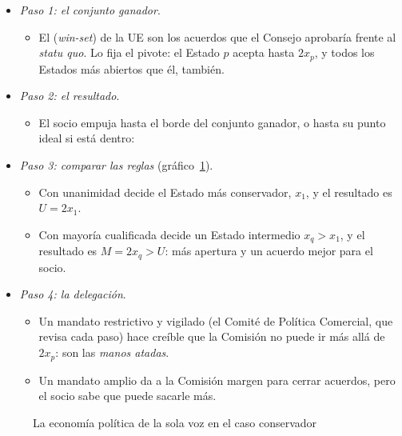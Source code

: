 \documentclass[11pt]{article}
\begin{document}
\begin{itemize}
\item \emph{Paso 1: el conjunto ganador}.
  \begin{itemize}
  \item El  (\emph{win-set}) de la UE son los acuerdos que el Consejo aprobaría frente al \emph{statu quo}. Lo fija el pivote: el Estado $p$ acepta hasta $2x_p$, y todos los Estados más abiertos que él, también.
  \end{itemize}
\item \emph{Paso 2: el resultado}.
  \begin{itemize}
  \item El socio empuja hasta el borde del conjunto ganador, o hasta su punto ideal si está dentro:
  \end{itemize}
\item \emph{Paso 3: comparar las reglas} (gráfico~\ref{fig:meunier}).
  \begin{itemize}
  \item Con unanimidad decide el Estado más conservador, $x_1$, y el resultado es $U=2x_1$.
  \item Con mayoría cualificada decide un Estado intermedio $x_q>x_1$, y el resultado es $M=2x_q>U$: más apertura y un acuerdo mejor para el socio.
  \end{itemize}
\item \emph{Paso 4: la delegación}.
  \begin{itemize}
  \item Un mandato restrictivo y vigilado (el Comité de Política Comercial, que revisa cada paso) hace creíble que la Comisión no puede ir más allá de $2x_p$: son las \emph{manos atadas}.
  \item Un mandato amplio da a la Comisión margen para cerrar acuerdos, pero el socio sabe que puede sacarle más.
  \end{itemize}
\end{itemize}

\begin{figure}[H]
\centering
\caption{La economía política de la sola voz en el caso conservador}\label{fig:meunier}
\end{figure}
\end{document}
